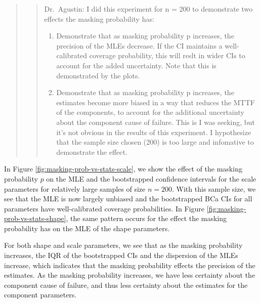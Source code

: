 \documentclass[
]{article}
\begin{document}
\begin{quote}
\begin{quote}
Dr.~Agustin: I did this experiment for n = 200 to demonstrate two
effects the masking probability has:

\begin{enumerate}
\def\labelenumi{(\arabic{enumi})}
\item
  Demonstrate that as masking probability p increases, the precision of
  the MLEs decrease. If the CI maintains a well-calibrated coverage
  probability, this will reslt in wider CIs to account for the added
  uncertainty. Note that this is demonstrated by the plots.
\item
  Demonstrate that as masking probability p increases, the estimates
  become more biased in a way that reduces the MTTF of the components,
  to account for the additional uncertainty about the component cause of
  failure. This is I was seeking, but it's not obvious in the results of
  this experiment. I hypothesize that the sample size chosen (200) is
  too large and infomative to demonstrate the effect.
\end{enumerate}
\end{quote}
\end{quote}

In Figure \ref{fig:masking-prob-vs-stats-scale}, we show the effect of
the masking probability \(p\) on the MLE and the bootstrapped confidence
intervals for the scale parameters for relatively large samples of size
\(n = 200\). With this sample size, we see that the MLE is now largely
unbiased and the bootstrapped BCa CIs for all parameters have
well-calibrated coverage probabilities. In Figure
\ref{fig:masking-prob-vs-stats-shape}, the same pattern occurs for the
effect the masking probability has on the MLE of the shape parameters.

For both shape and scale parameters, we see that as the masking
probability increases, the IQR of the bootstrapped CIs and the
dispersion of the MLEs increase, which indicates that the masking
probability effects the precision of the estimates. As the masking
probability increases, we have less certainty about the component cause
of failure, and thus less certainty about the estimates for the
component parameters.
\end{document}
